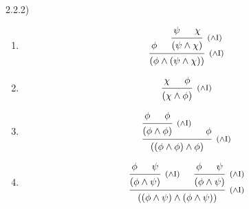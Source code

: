 \documentclass{article}
\theoremstyle{definition}
\newcommand{\ci}{\footnotesize ($\wedge$I)}
\begin{document}
2.2.2)
\begin{enumerate}[label=(\alph*)]
  \item 
  \[
    \begin{prooftree}
      \hypo{\phi}
      \hypo{\psi}
      \hypo{\chi}
      \infer2[\ci]{(\psi\land\chi)}
      \infer2[\ci]{(\phi \land (\psi\land\chi))}
    \end{prooftree}
  \]
  \item 
  \[
    \begin{prooftree}
      \hypo{\chi}
      \hypo{\phi}
      \infer2[\ci]{(\chi\land\phi)}
    \end{prooftree}
  \]

  \item 
  \[
    \begin{prooftree}
      \hypo{\phi}
      \hypo{\phi}
      \infer2[\ci]{(\phi\land\phi)}
      \hypo{\phi}
      \infer2[\ci]{((\phi\land\phi)\land \phi)}
    \end{prooftree}
  \]
  \item 
  \[
    \begin{prooftree}
      \hypo{\phi}
      \hypo{\psi}
      \infer2[\ci]{(\phi\land\psi)}
      \hypo{\phi}
      \hypo{\psi}
      \infer2[\ci]{(\phi\land\psi)}
      \infer2[\ci]{((\phi\land\psi)\land(\phi\land\psi))}
    \end{prooftree}
  \]

\end{enumerate}
\end{document}
